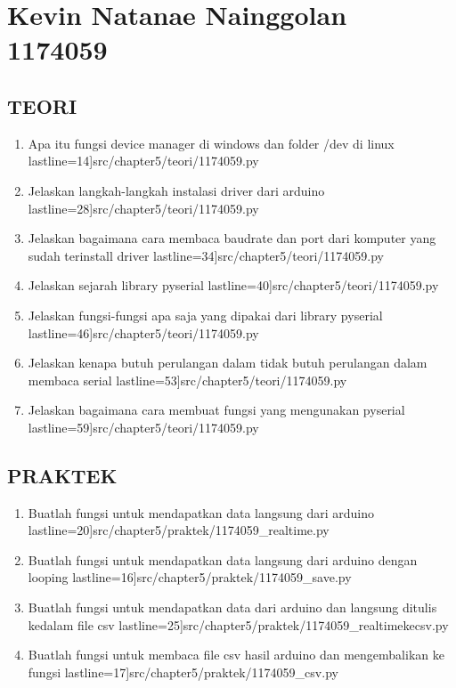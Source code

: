\section {Kevin Natanae Nainggolan 1174059}
	\subsection {TEORI}
	\begin {enumerate}
		\item  Apa itu fungsi device manager di windows dan folder /dev di linux
			 lastline=14]{src/chapter5/teori/1174059.py}
		\item Jelaskan langkah-langkah instalasi driver dari arduino
			 lastline=28]{src/chapter5/teori/1174059.py}
		\item Jelaskan bagaimana cara membaca baudrate dan port dari komputer yang sudah terinstall driver
			 lastline=34]{src/chapter5/teori/1174059.py}
		\item Jelaskan sejarah library pyserial
			 lastline=40]{src/chapter5/teori/1174059.py}
		\item Jelaskan fungsi-fungsi apa saja yang dipakai dari library pyserial
			 lastline=46]{src/chapter5/teori/1174059.py}
		\item Jelaskan kenapa butuh perulangan dalam tidak butuh perulangan dalam membaca serial
			 lastline=53]{src/chapter5/teori/1174059.py}
		\item Jelaskan bagaimana cara membuat fungsi yang mengunakan pyserial
			 lastline=59]{src/chapter5/teori/1174059.py}
	\end {enumerate}

	\subsection {PRAKTEK}
		\begin {enumerate}
			\item  Buatlah fungsi untuk mendapatkan data langsung dari arduino
				 lastline=20]{src/chapter5/praktek/1174059_realtime.py}
			\item Buatlah fungsi  untuk mendapatkan data langsung dari arduino dengan looping
				 lastline=16]{src/chapter5/praktek/1174059_save.py}
			\item Buatlah fungsi  untuk mendapatkan data dari arduino dan langsung ditulis kedalam file csv
				 lastline=25]{src/chapter5/praktek/1174059_realtimekecsv.py}
			\item Buatlah fungsi  untuk membaca ﬁle csv hasil arduino dan mengembalikan ke fungsi
				 lastline=17]{src/chapter5/praktek/1174059_csv.py}
		\end {enumerate}
		
